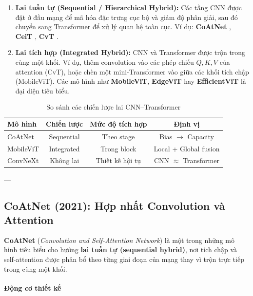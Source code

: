 \begin{enumerate}
	\item \textbf{Lai tuần tự (Sequential / Hierarchical Hybrid):}  
	Các tầng CNN được đặt ở đầu mạng để mã hóa đặc trưng cục bộ và giảm độ phân giải, sau đó chuyển sang Transformer để xử lý quan hệ toàn cục.  
	Ví dụ: \textbf{CoAtNet} \cite{Dai2021}, \textbf{CeiT} \cite{Yuan2021CeiT}, \textbf{CvT} \cite{Wu2021}.
	
	\item \textbf{Lai tích hợp (Integrated Hybrid):}  
	CNN và Transformer được trộn trong cùng một khối. Ví dụ, thêm convolution vào các phép chiếu $Q,K,V$ của attention (CvT), hoặc chèn một mini-Transformer vào giữa các khối tích chập (MobileViT).  
	Các mô hình như \textbf{MobileViT}, \textbf{EdgeViT} hay \textbf{EfficientViT} là đại diện tiêu biểu.
\end{enumerate}
\begin{table}[h]
	\centering
	\caption{So sánh các chiến lược lai CNN–Transformer}
	\begin{tabular}{lccc}
		\toprule
		\textbf{Mô hình} & \textbf{Chiến lược} & \textbf{Mức độ tích hợp} & \textbf{Định vị} \\
		\midrule
		CoAtNet & Sequential & Theo stage & Bias $\rightarrow$ Capacity \\
		MobileViT & Integrated & Trong block & Local + Global fusion \\
		ConvNeXt & Không lai & Thiết kế hội tụ & CNN $\approx$ Transformer \\
		\bottomrule
	\end{tabular}
\end{table}

---

\subsection{CoAtNet (2021): Hợp nhất Convolution và Attention}
\label{subsec:coatnet}

\textbf{CoAtNet} (\textit{Convolution and Self-Attention Network}) \cite{Dai2021} là một trong những mô hình tiêu biểu cho hướng \textbf{lai tuần tự (sequential hybrid)}, nơi tích chập và self-attention được phân bổ theo từng giai đoạn của mạng thay vì trộn trực tiếp trong cùng một khối.

\paragraph{Động cơ thiết kế}


